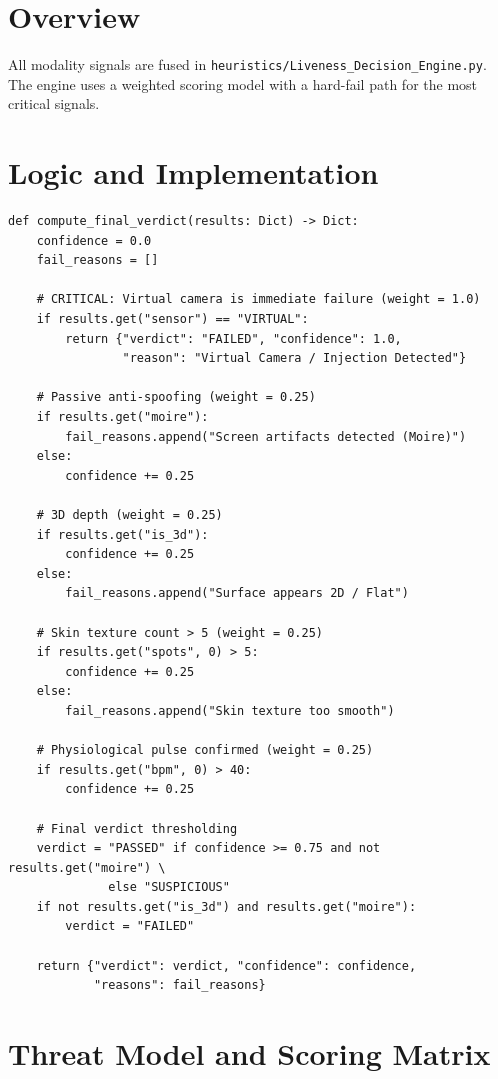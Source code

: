 \documentclass[12pt,a4paper]{report}
\begin{document}
\section{Overview}
All modality signals are fused in \texttt{heuristics/Liveness\_Decision\_Engine.py}. The engine uses a weighted scoring model with a hard-fail path for the most critical signals.

\section{Logic and Implementation}

\begin{lstlisting}[style=pythonstyle, caption={Decision Engine --- Liveness\_Decision\_Engine.py}]
def compute_final_verdict(results: Dict) -> Dict:
    confidence = 0.0
    fail_reasons = []

    # CRITICAL: Virtual camera is immediate failure (weight = 1.0)
    if results.get("sensor") == "VIRTUAL":
        return {"verdict": "FAILED", "confidence": 1.0,
                "reason": "Virtual Camera / Injection Detected"}

    # Passive anti-spoofing (weight = 0.25)
    if results.get("moire"):
        fail_reasons.append("Screen artifacts detected (Moire)")
    else:
        confidence += 0.25

    # 3D depth (weight = 0.25)
    if results.get("is_3d"):
        confidence += 0.25
    else:
        fail_reasons.append("Surface appears 2D / Flat")

    # Skin texture count > 5 (weight = 0.25)
    if results.get("spots", 0) > 5:
        confidence += 0.25
    else:
        fail_reasons.append("Skin texture too smooth")

    # Physiological pulse confirmed (weight = 0.25)
    if results.get("bpm", 0) > 40:
        confidence += 0.25

    # Final verdict thresholding
    verdict = "PASSED" if confidence >= 0.75 and not results.get("moire") \
              else "SUSPICIOUS"
    if not results.get("is_3d") and results.get("moire"):
        verdict = "FAILED"

    return {"verdict": verdict, "confidence": confidence,
            "reasons": fail_reasons}
\end{lstlisting}

\section{Threat Model and Scoring Matrix}
\end{document}
